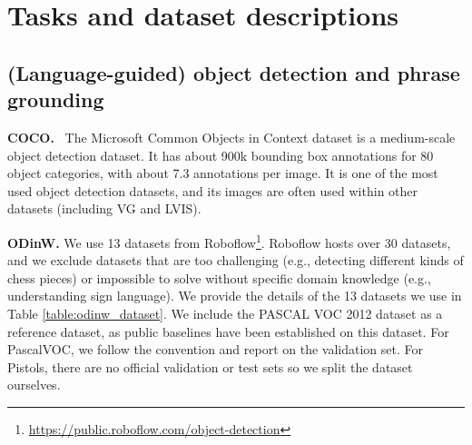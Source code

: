 \documentclass{article}
\begin{document}
\section{Tasks and dataset descriptions}
\label{sec:tasks}
\subsection{(Language-guided) object detection and phrase grounding}

\textbf{COCO.}~\cite{caesar2018coco} The Microsoft Common Objects in Context dataset is a medium-scale object detection dataset. It has about 900k bounding box annotations for 80 object categories, with about 7.3 annotations per image. It is one of the most used object detection datasets, and its images are often used within other datasets (including VG and LVIS).

\textbf{ODinW.} We use 13 datasets from Roboflow\footnote{\url{https://public.roboflow.com/object-detection}}. Roboflow hosts over 30 datasets, and we exclude datasets that are too challenging (e.g., detecting different kinds of chess pieces) or impossible to solve without specific domain knowledge (e.g., understanding sign language). We provide the details of the 13 datasets we use in Table \ref{table:odinw_dataset}. We include the PASCAL VOC 2012 dataset as a reference dataset, as public baselines have been established on this dataset. For PascalVOC, we follow the convention and report on the validation set. For Pistols, there are no official validation or test sets so we split the dataset ourselves. 
\end{document}
